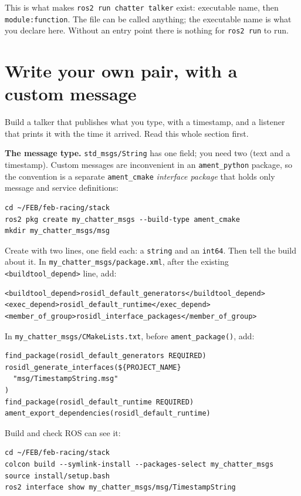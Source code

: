 \documentclass[11pt,a4paper]{article}
\begin{document}
This is what makes \texttt{ros2 run chatter talker} exist: executable name, then
\texttt{module:function}. The file can be called anything; the executable name is what you
declare here. Without an entry point there is nothing for \texttt{ros2 run} to run.

\section{Write your own pair, with a custom message}
\label{sec:custom}

Build a talker that publishes what you type, with a timestamp, and a listener that prints it
with the time it arrived. Read this whole section first.

\textbf{The message type.} \texttt{std\_msgs/String} has one field; you need two (text and a
timestamp). Custom messages are inconvenient in an \texttt{ament\_python} package, so the
convention is a separate \texttt{ament\_cmake} \emph{interface package} that holds only message
and service definitions:

\begin{lstlisting}
cd ~/FEB/feb-racing/stack
ros2 pkg create my_chatter_msgs --build-type ament_cmake
mkdir my_chatter_msgs/msg
\end{lstlisting}

Create  with two lines, one field each: a
\texttt{string} and an \texttt{int64}. Then tell the build about it. In
\texttt{my\_chatter\_msgs/package.xml}, after the existing \texttt{<buildtool\_depend>} line, add:

\begin{lstlisting}
<buildtool_depend>rosidl_default_generators</buildtool_depend>
<exec_depend>rosidl_default_runtime</exec_depend>
<member_of_group>rosidl_interface_packages</member_of_group>
\end{lstlisting}

In \texttt{my\_chatter\_msgs/CMakeLists.txt}, before \texttt{ament\_package()}, add:

\begin{lstlisting}
find_package(rosidl_default_generators REQUIRED)
rosidl_generate_interfaces(${PROJECT_NAME}
  "msg/TimestampString.msg"
)
find_package(rosidl_default_runtime REQUIRED)
ament_export_dependencies(rosidl_default_runtime)
\end{lstlisting}

Build and check ROS can see it:

\begin{lstlisting}
cd ~/FEB/feb-racing/stack
colcon build --symlink-install --packages-select my_chatter_msgs
source install/setup.bash
ros2 interface show my_chatter_msgs/msg/TimestampString
\end{lstlisting}
\end{document}

